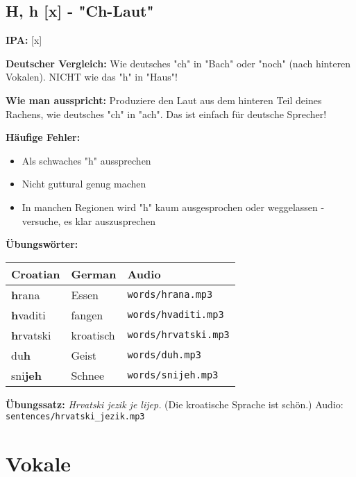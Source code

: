 \subsection{H, h [x] - "Ch-Laut"}

\begin{tcolorbox}[breakable, colback=lightyellow!30, colframe=orange, title=\textbf{H, h}]

\textbf{IPA:} [x]

\textbf{Deutscher Vergleich:}
Wie deutsches "ch" in "Bach" oder "noch" (nach hinteren Vokalen). NICHT wie das "h" in "Haus"!

\textbf{Wie man ausspricht:}
Produziere den Laut aus dem hinteren Teil deines Rachens, wie deutsches "ch" in "ach". Das ist einfach für deutsche Sprecher!

\textbf{Häufige Fehler:}
\begin{itemize}
    \item Als schwaches "h" aussprechen
    \item Nicht guttural genug machen
    \item In manchen Regionen wird "h" kaum ausgesprochen oder weggelassen - versuche, es klar auszusprechen
\end{itemize}

\textbf{Übungswörter:}
\begin{center}
\small
\begin{tabular}{lll}
\textbf{Croatian} & \textbf{German} & \textbf{Audio} \\
\midrule
\textbf{h}rana & Essen & \small\texttt{words/hrana.mp3} \\
\textbf{h}vaditi & fangen & \small\texttt{words/hvaditi.mp3} \\
\textbf{h}rvatski & kroatisch & \small\texttt{words/hrvatski.mp3} \\
du\textbf{h} & Geist & \small\texttt{words/duh.mp3} \\
sni\textbf{jeh} & Schnee & \small\texttt{words/snijeh.mp3} \\
\end{tabular}
\end{center}

\textbf{Übungssatz:}
\textit{Hrvatski jezik je lijep.}
(Die kroatische Sprache ist schön.)
Audio: \small\texttt{sentences/hrvatski\_jezik.mp3}

\end{tcolorbox}

\section{Vokale}

